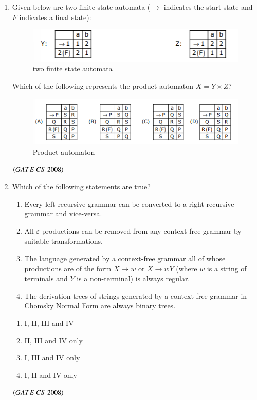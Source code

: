 \documentclass[journal, onecolumn]{IEEEtran}
\numberwithin{equation}{enumi}
\numberwithin{figure}{enumi}
\begin{document}
\begin{enumerate}
\item  Given below are two finite state automata ($\rightarrow$ indicates the start state and $F$ indicates a final state):
\begin{figure}[H]
    \centering
    \includegraphics[width=0.5\columnwidth]{figs/fig5.png}
    \caption{two finite state automata}
    \label{figs:5}
\end{figure}

Which of the following represents the product automaton $X = Y \times Z$?
\begin{figure}[H]
    \centering
    \includegraphics[width=0.5\columnwidth]{figs/fig6.png}
    \caption{Product automaton}
    \label{fig:6}
\end{figure}
\hfill $\left(GATE\ CS\  2008\right)$
\bigskip

\item Which of the following statements are true?
\begin{enumerate}[label=\Roman*.]
   \item Every left-recursive grammar can be converted to a right-recursive grammar and vice-versa.
   \item All $\varepsilon$-productions can be removed from any context-free grammar by suitable transformations.
   \item The language generated by a context-free grammar all of whose productions are of the form $X\to w$ or $X\to wY$ (where $w$ is a string of terminals and $Y$ is a non-terminal) is always regular.
   \item The derivation trees of strings generated by a context-free grammar in Chomsky Normal Form are always binary trees.
\end{enumerate}
\vspace{-1em}%
\begin{multicols}{2}
\begin{enumerate}
   \item I, II, III and IV
   \item II, III and IV only
   \item I, III and IV only
   \item I, II and IV only
\end{enumerate}
\end{multicols}
\hfill $\left(GATE\ CS\  2008\right)$


\end{enumerate}
\end{document}
